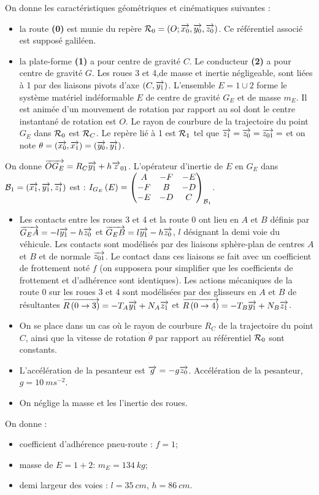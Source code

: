 \documentclass[10pt,fleqn]{article} %
\begin{document}
\begin{multicols}{2}
On donne les caractéristiques géométriques et cinématiques suivantes :
\begin{itemize}
\item la route \textbf{(0)} est munie du repère $\rep{0}=\repere{O}{x_0}{y_0}{z_0}$. Ce référentiel associé est supposé galiléen.
\item la plate-forme \textbf{(1)} a pour centre de gravité $C$. Le conducteur \textbf{(2)} a pour centre de gravité $G$. Les roues 3 et 4,de masse et inertie négligeable, sont liées à 1 par des liaisons pivots d'axe $\axe{C}{y_1}$. L’ensemble 
$E=1\cup 2$ forme le système matériel indéformable $E$ de centre de gravité $G_E$ et de masse $m_E$. Il est animée d'un mouvement de rotation par rapport au sol dont le centre instantané de rotation est $O$. Le rayon de courbure de la trajectoire du point $G_E$ dans $\rep{0}$ est $\rep{C}$. Le repère lié à 1 est $\rep{1}$  tel que $\vect{z_1}=\vect{z_0}=\vect{z_{01}}=$ et on note $\theta=\angl{x_0}{x_1}=\angl{y_0}{y_1}$. 
\end{itemize}


On donne $\vect{OG_E}=R_C\vect{y_1}+h\vect{z}_{01}$. L'opérateur d'inertie de $E$ en $G_E$ dans $\mathcal{B}_1=\base{x_1}{y_1}{z_1}$ est : 
$\inertie{G_E}{E}=\matinertie{A}{B}{C}{-D}{-E}{-F}{\mathcal{B}_1}$.

\begin{hypo}
\begin{itemize} 
\item Les contacts entre les roues 3 et 4 et la route 0 ont lieu en $A$ et $B$ définis par $\vect{G_EA}=-l\vect{y_1}-h\vect{z_0}$ et $\vect{G_EB}=l\vect{y_1}-h\vect{z_0}$, $l$ désignant la demi voie du véhicule. Les contacts sont modélisés par des liaisons sphère-plan de centres $A$ et $B$ et de normale $\vect{z_{01}}$. Le contact dans ces liaisons se fait avec un coefficient de frottement noté $f$ (on supposera pour simplifier que les coefficients de frottement et d'adhérence sont identiques). Les actions mécaniques de la route 0 sur les roues 3 et 4 sont modélisées par des glisseurs en $A$ et $B$ de résultantes $\vectf{0}{3}=-T_A\vect{y_1}+N_A\vect{z_1}$ et $\vectf{0}{4}=-T_B\vect{y_1}+N_B\vect{z_1}$.
\item On se place dans un cas où le rayon de courbure $R_C$ de la trajectoire du point $C$, ainsi que la vitesse de rotation $\dot{\theta}$ par rapport au référentiel $\rep{0}$ sont constants.
\item L'accélération de la pesanteur est $\vect{g}=-g\vect{z_0}$. Accélération de la pesanteur, $g=\SI{10}{ms^{-2}}$.
\item On néglige la masse et les l'inertie des roues. 
\end{itemize}
\end{hypo}
On donne : 	
\begin{itemize}
\item coefficient d'adhérence pneu-route :  $f=1$;
\item masse de $E=1+2$:  $m_E=\SI{134}{kg}$;
\item demi largeur des voies :  $l=\SI{35}{cm}$,  $h=\SI{86}{cm}$.
\end{itemize}
\fi


\end{multicols}
\end{document}
